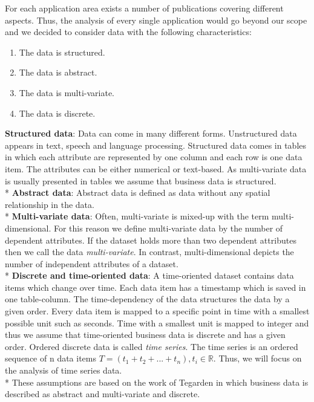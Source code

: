 For each application area exists a number of publications covering different aspects. Thus, the analysis of every single application would go beyond our scope and we decided to consider data with the following characteristics: 
\begin{enumerate}
    \item The data is structured. 
    \item The data is abstract.
    \item The data is multi-variate.
    \item The data is discrete.
\end{enumerate}
\textbf{Structured data}: Data can come in many different forms. Unstructured data appears in text, speech and language processing\cite{Borgo2013}. Structured data comes in tables in which each attribute are represented by one column and each row is one data item. The attributes can be either numerical or text-based. As multi-variate data is usually presented in tables\cite{Borgo2013} we assume that business data is structured.\\*
\textbf{Abstract data}: Abstract data is defined as data without any spatial relationship in the data\cite{Shneiderman1996}. \\*
\textbf{Multi-variate data}: 
Often, multi-variate is mixed-up with the term multi-dimensional. For this reason we define  multi-variate data by the number of dependent attributes. If the dataset holds more than two dependent attributes then we call the data \textit{multi-variate}. In contrast, multi-dimensional depicts the number of independent attributes of a dataset\cite{Aigner2011}.  \\*
\textbf{Discrete and time-oriented data}: A time-oriented dataset contains data items which change over time. Each data item has a timestamp which is saved in one table-column. The time-dependency of the data structures the data by a given order. Every data item is mapped to a specific point in time with a smallest possible unit such as seconds. Time with a smallest unit is mapped to integer\cite{Aigner2011} and thus we assume that time-oriented business data is discrete and has a given order. Ordered discrete data is called \textit{time series}. The time series is an ordered sequence of n data items $T=(t_1+t_2+...+t_n),t_i\in\mathbb{R}$. Thus, we will focus on the analysis of time series data. \\*
These assumptions are based on the work of Tegarden in which business data is described as abstract and multi-variate and discrete\cite{Tegarden1999}.
